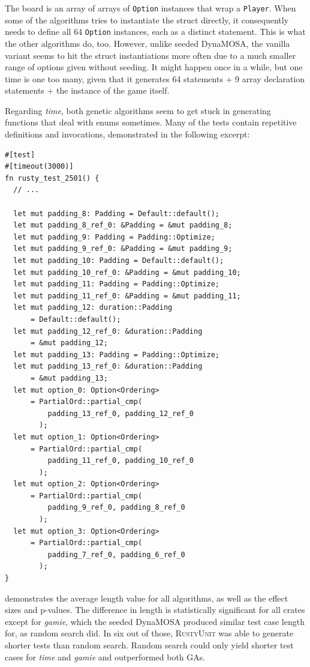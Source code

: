 \documentclass[paper=a4,%
  twoside,%
  BCOR4mm,%
  abstract=true,%
  toc=bibliography,%
  chapterprefix=true,%
  toc=bibliographynumbered,%
  open=right,%
  english,%
  pagesize=pdftex]{scrreprt}
\newcommand{\tech}{\textsc{RustyUnit}\xspace}
\begin{document}
The board is an array of arrays of \texttt{Option} instances that wrap a \texttt{Player}. When some of the algorithms tries to instantiate the struct directly, it consequently needs to define all 64 \texttt{Option} instances, each as a distinct statement. This is what the other algorithms do, too. However, unlike seeded DynaMOSA, the vanilla variant seems to hit the struct instantiations more often due to a much smaller range of options given without seeding. It might happen once in a while, but one time is one too many, given that it generates 64 statements + 9 array declaration statements + the instance of the game itself.

Regarding \emph{time}, both genetic algorithms seem to get stuck in generating functions that deal with enums sometimes. Many of the tests contain repetitive definitions and invocations, demonstrated in the following excerpt:

\begin{lstlisting}[style=boxed, caption={}, label={}, escapechar=§]
#[test]
#[timeout(3000)]
fn rusty_test_2501() {
  // ...

  let mut padding_8: Padding = Default::default();
  let mut padding_8_ref_0: &Padding = &mut padding_8;
  let mut padding_9: Padding = Padding::Optimize;
  let mut padding_9_ref_0: &Padding = &mut padding_9;
  let mut padding_10: Padding = Default::default();
  let mut padding_10_ref_0: &Padding = &mut padding_10;
  let mut padding_11: Padding = Padding::Optimize;
  let mut padding_11_ref_0: &Padding = &mut padding_11;
  let mut padding_12: duration::Padding
      = Default::default();
  let mut padding_12_ref_0: &duration::Padding
      = &mut padding_12;
  let mut padding_13: Padding = Padding::Optimize;
  let mut padding_13_ref_0: &duration::Padding
      = &mut padding_13;
  let mut option_0: Option<Ordering>
      = PartialOrd::partial_cmp(
          padding_13_ref_0, padding_12_ref_0
        );
  let mut option_1: Option<Ordering>
      = PartialOrd::partial_cmp(
          padding_11_ref_0, padding_10_ref_0
        );
  let mut option_2: Option<Ordering>
      = PartialOrd::partial_cmp(
          padding_9_ref_0, padding_8_ref_0
        );
  let mut option_3: Option<Ordering>
      = PartialOrd::partial_cmp(
          padding_7_ref_0, padding_6_ref_0
        );
}
\end{lstlisting}


 demonstrates the average length value for all algorithms, as well as the effect sizes and p-values. The difference in length is statistically significant for all crates except for \emph{gamie}, which the seeded DynaMOSA produced similar test case length for, as random search did. In six out of those, \tech was able to generate shorter tests than random search. Random search could only yield shorter test cases for \emph{time} and \emph{gamie} and outperformed both \acp{GA}.
\end{document}
